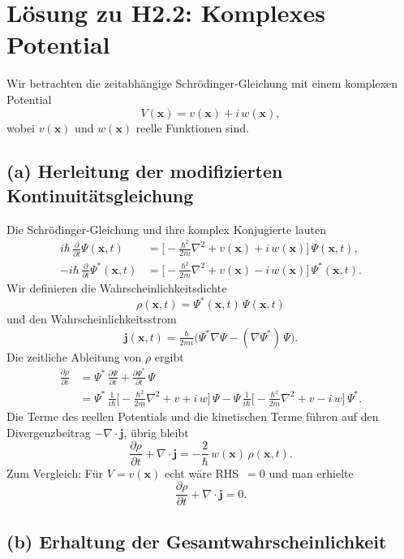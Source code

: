 \documentclass[a4paper,12pt]{article}
\begin{document}
\section*{Lösung zu H2.2: Komplexes Potential}

Wir betrachten die zeitabhängige Schrödinger-Gleichung mit einem komplexen Potential
\[
V(\mathbf{x}) = v(\mathbf{x}) + i\,w(\mathbf{x}),
\]
wobei $v(\mathbf{x})$ und $w(\mathbf{x})$ reelle Funktionen sind.

\subsection*{(a) Herleitung der modifizierten Kontinuitätsgleichung}

Die Schrödinger-Gleichung und ihre komplex Konjugierte lauten
\begin{align}
  i\hbar\,\frac{\partial}{\partial t}\Psi(\mathbf{x},t) &= \bigl[-\tfrac{\hbar^2}{2m}\nabla^2 + v(\mathbf{x}) + i\,w(\mathbf{x})\bigr]\,\Psi(\mathbf{x},t), \\
  -i\hbar\,\frac{\partial}{\partial t}\Psi^*(\mathbf{x},t) &= \bigl[-\tfrac{\hbar^2}{2m}\nabla^2 + v(\mathbf{x}) - i\,w(\mathbf{x})\bigr]\,\Psi^*(\mathbf{x},t).
\end{align}
Wir definieren die Wahrscheinlichkeitsdichte
\[
\rho(\mathbf{x},t) = \Psi^*(\mathbf{x},t)\,\Psi(\mathbf{x},t)
\]
und den Wahrscheinlichkeitsstrom
\[
\mathbf{j}(\mathbf{x},t) = \tfrac{\hbar}{2mi}\bigl(\Psi^*\nabla\Psi - (\nabla\Psi^*)\,\Psi\bigr).
\]
Die zeitliche Ableitung von $\rho$ ergibt
\begin{align*}
  \frac{\partial \rho}{\partial t}
  &= \Psi^*\,\frac{\partial \Psi}{\partial t} + \frac{\partial \Psi^*}{\partial t}\,\Psi \\
  &= \Psi^*\,\frac{1}{i\hbar}\bigl[-\tfrac{\hbar^2}{2m}\nabla^2 + v + i\,w\bigr]\,\Psi
     - \Psi\,\frac{1}{i\hbar}\bigl[-\tfrac{\hbar^2}{2m}\nabla^2 + v - i\,w\bigr]\,\Psi^*.
\end{align*}
Die Terme des reellen Potentials und die kinetischen Terme führen auf den Divergenzbeitrag $-\nabla\cdot\mathbf{j}$, übrig bleibt
\[
\frac{\partial \rho}{\partial t} + \nabla\cdot\mathbf{j} = -\frac{2}{\hbar}\,w(\mathbf{x})\,\rho(\mathbf{x},t).
\]
Zum Vergleich: Für $V=v(\mathbf{x})$ echt wäre RHS~$=0$ und man erhielte
\[
\frac{\partial \rho}{\partial t} + \nabla\cdot\mathbf{j} = 0.
\]

\subsection*{(b) Erhaltung der Gesamtwahrscheinlichkeit}
\end{document}

